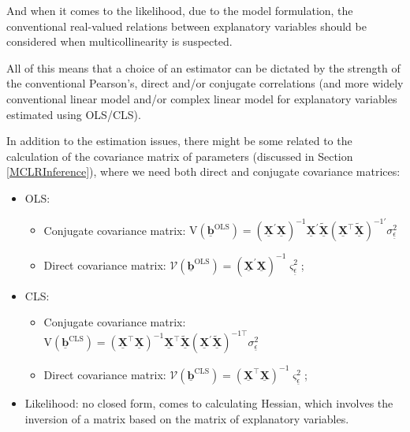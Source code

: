 \documentclass[
]{book}
\providecommand{\tightlist}{%
  \setlength{\itemsep}{0pt}\setlength{\parskip}{0pt}}
\begin{document}
And when it comes to the likelihood, due to the model formulation, the conventional real-valued relations between explanatory variables should be considered when multicollinearity is suspected.

All of this means that a choice of an estimator can be dictated by the strength of the conventional Pearson's, direct and/or conjugate correlations (and more widely conventional linear model and/or complex linear model for explanatory variables estimated using OLS/CLS).

In addition to the estimation issues, there might be some related to the calculation of the covariance matrix of parameters (discussed in Section \ref{MCLRInference}), where we need both direct and conjugate covariance matrices:

\begin{itemize}
\tightlist
\item
  OLS:

  \begin{itemize}
  \tightlist
  \item
    Conjugate covariance matrix: \(\mathrm{V}\left( \underline{\boldsymbol{b}}^{\text{OLS}} \right) = \left( \underline{\mathbf{X}}^\prime \underline{\mathbf{X}} \right)^{-1} \underline{\mathbf{X}}^\prime \tilde{\underline{\mathbf{X}}} \left( {\underline{\mathbf{X}}}^\top \tilde{\underline{\mathbf{X}}} \right)^{-1 \prime} \sigma_{\underline{\epsilon}}^2\)
  \item
    Direct covariance matrix: \(\mathcal{V}\left( \underline{\boldsymbol{b}}^{\text{OLS}} \right) = \left( \underline{\mathbf{X}}^\prime \underline{\mathbf{X}} \right)^{-1} \varsigma_{\underline{\epsilon}}^2\);
  \end{itemize}
\item
  CLS:

  \begin{itemize}
  \tightlist
  \item
    Conjugate covariance matrix: \(\mathrm{V}\left( \underline{\boldsymbol{b}}^{\text{CLS}} \right) = \left( \underline{\mathbf{X}}^\top \underline{\mathbf{X}} \right)^{-1} \underline{\mathbf{X}}^\top \tilde{\underline{\mathbf{X}}} \left( {\underline{\mathbf{X}}}^\prime \tilde{\underline{\mathbf{X}}} \right)^{-1 \top} \sigma_{\underline{\epsilon}}^2\)
  \item
    Direct covariance matrix: \(\mathcal{V}\left( \underline{\boldsymbol{b}}^{\text{CLS}} \right) = \left( \underline{\mathbf{X}}^\top \underline{\mathbf{X}} \right)^{-1} \varsigma_{\underline{\epsilon}}^2\);
  \end{itemize}
\item
  Likelihood: no closed form, comes to calculating Hessian, which involves the inversion of a matrix based on the matrix of explanatory variables.
\end{itemize}
\end{document}
